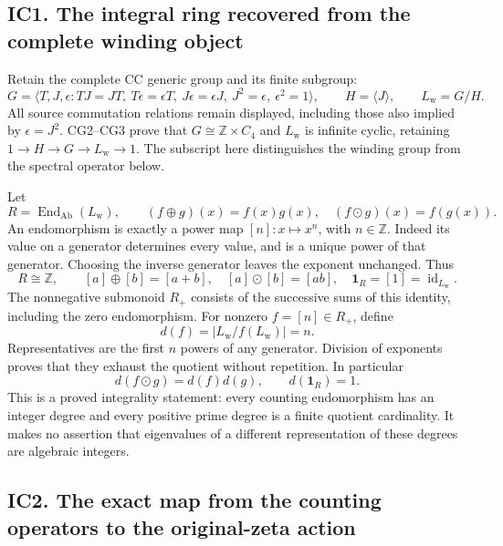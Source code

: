 \documentclass[
]{article}
\begin{document}
\subsection{IC1. The integral ring recovered from the complete winding
object}\label{ic1.-the-integral-ring-recovered-from-the-complete-winding-object}

Retain the complete CC generic group and its finite subgroup: \[
G=\langle T,J,\epsilon:
TJ=JT,\ T\epsilon=\epsilon T,\ J\epsilon=\epsilon J,
\ J^2=\epsilon,\ \epsilon^2=1\rangle,
\qquad H=\langle J\rangle,\qquad L_{\mathrm w}=G/H.
\tag{IC1.1}
\] All source commutation relations remain displayed, including those
also implied by \(\epsilon=J^2\). CG2--CG3 prove that
\(G\cong\mathbb Z\times C_4\) and \(L_{\mathrm w}\) is infinite cyclic,
retaining \(1\to H\to G\to L_{\mathrm w}\to1\). The subscript here
distinguishes the winding group from the spectral operator below.

Let \[
R=\operatorname{End}_{\mathrm{Ab}}(L_{\mathrm w}),\qquad
(f\oplus g)(x)=f(x)g(x),\quad (f\odot g)(x)=f(g(x)).
\tag{IC1.2}
\] An endomorphism is exactly a power map \([n]:x\mapsto x^n\), with
\(n\in\mathbb Z\). Indeed its value on a generator determines every
value, and is a unique power of that generator. Choosing the inverse
generator leaves the exponent unchanged. Thus \[
R\cong\mathbb Z,\qquad [a]\oplus[b]=[a+b],\quad
[a]\odot[b]=[ab],\quad \mathbf1_R=[1]=\operatorname{id}_{L_{\mathrm w}}.
\tag{IC1.3}
\] The nonnegative submonoid \(R_+\) consists of the successive sums of
this identity, including the zero endomorphism. For nonzero
\(f=[n]\in R_+\), define \[
d(f)=|L_{\mathrm w}/f(L_{\mathrm w})|=n.
\tag{IC1.4}
\] Representatives are the first \(n\) powers of any generator. Division
of exponents proves that they exhaust the quotient without repetition.
In particular \[
d(f\odot g)=d(f)d(g),\qquad d(\mathbf1_R)=1.
\tag{IC1.5}
\] This is a proved integrality statement: every counting endomorphism
has an integer degree and every positive prime degree is a finite
quotient cardinality. It makes no assertion that eigenvalues of a
different representation of these degrees are algebraic integers.

\subsection{IC2. The exact map from the counting operators to the
original-zeta
action}\label{ic2.-the-exact-map-from-the-counting-operators-to-the-original-zeta-action}
\end{document}
